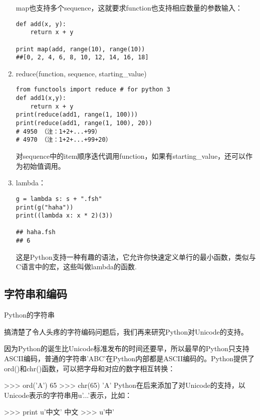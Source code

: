 \begin{enumerate}
map也支持多个sequence，这就要求function也支持相应数量的参数输入：
\begin{verbatim}
def add(x, y):
    return x + y 

print map(add, range(10), range(10)) 
##[0, 2, 4, 6, 8, 10, 12, 14, 16, 18]
\end{verbatim}

\item reduce(function, sequence, starting\_value)
\begin{verbatim}
from functools import reduce # for python 3
def add1(x,y):
    return x + y
print(reduce(add1, range(1, 100)))
print(reduce(add1, range(1, 100), 20))
# 4950 （注：1+2+...+99）
# 4970 （注：1+2+...+99+20）
\end{verbatim}

对sequence中的item顺序迭代调用function，如果有starting\_value，还可以作为初始值调用。


\item lambda：
    \newpage
\begin{verbatim}
g = lambda s: s + ".fsh"
print(g("haha"))
print((lambda x: x * 2)(3))

## haha.fsh
## 6
\end{verbatim}

这是Python支持一种有趣的语法，它允许你快速定义单行的最小函数，类似与C语言中的宏，这些叫做lambda的函数.
\end{enumerate}


\subsection{字符串和编码}

Python的字符串

搞清楚了令人头疼的字符编码问题后，我们再来研究Python对Unicode的支持。

因为Python的诞生比Unicode标准发布的时间还要早，所以最早的Python只支持ASCII编码，普通的字符串'ABC'在Python内部都是ASCII编码的。Python提供了ord()和chr()函数，可以把字母和对应的数字相互转换：

>>> ord('A')
65
>>> chr(65)
'A'
Python在后来添加了对Unicode的支持，以Unicode表示的字符串用u'...'表示，比如：

>>> print u'中文'
中文
>>> u'中'

